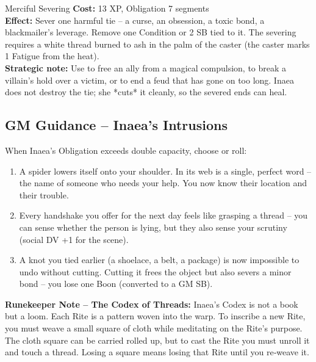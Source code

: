\documentclass[10pt,a5paper]{book}
\begin{document}
\begin{patronbox}{Merciful Severing}
\textbf{Cost:} 13 XP, Obligation 7 segments \\
\textbf{Effect:} Sever one harmful tie – a curse, an obsession, a toxic bond, a blackmailer’s leverage. Remove one Condition or 2 SB tied to it. The severing requires a white thread burned to ash in the palm of the caster (the caster marks 1 Fatigue from the heat). \\
\textbf{Strategic note:} Use to free an ally from a magical compulsion, to break a villain’s hold over a victim, or to end a feud that has gone on too long. Inaea does not destroy the tie; she *cuts* it cleanly, so the severed ends can heal.
\end{patronbox}

\subsection*{GM Guidance – Inaea’s Intrusions}

When Inaea’s Obligation exceeds double capacity, choose or roll:
\begin{enumerate}
    \item A spider lowers itself onto your shoulder. In its web is a single, perfect word – the name of someone who needs your help. You now know their location and their trouble.
    \item Every handshake you offer for the next day feels like grasping a thread – you can sense whether the person is lying, but they also sense your scrutiny (social DV +1 for the scene).
    \item A knot you tied earlier (a shoelace, a belt, a package) is now impossible to undo without cutting. Cutting it frees the object but also severs a minor bond – you lose one Boon (converted to a GM SB).
\end{enumerate}

\noindent \textbf{Runekeeper Note – The Codex of Threads:}
Inaea’s Codex is not a book but a loom. Each Rite is a pattern woven into the warp. To inscribe a new Rite, you must weave a small square of cloth while meditating on the Rite’s purpose. The cloth square can be carried rolled up, but to cast the Rite you must unroll it and touch a thread. Losing a square means losing that Rite until you re‑weave it.

\clearpage

\end{document}
